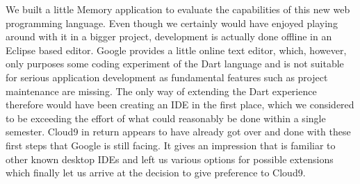 We built a little Memory application to evaluate the capabilities of this new web programming language.
Even though we certainly would have enjoyed playing around with it in a bigger project,
development is actually done offline in an Eclipse based editor. Google provides a little online text editor, which,
however, only purposes some coding experiment of the Dart language and is not suitable for serious application development
as fundamental features such as project maintenance are missing. The only way of extending the Dart experience therefore
would have been creating an IDE in the first place, which we considered to be exceeding the effort of what could reasonably
be done within a single semester.
Cloud9 in return appears to have already got over and done with these first steps that
Google is still facing. It gives an impression that is familiar to other known desktop IDEs and left us various options
for possible extensions which finally let us arrive at the decision to give preference to Cloud9.